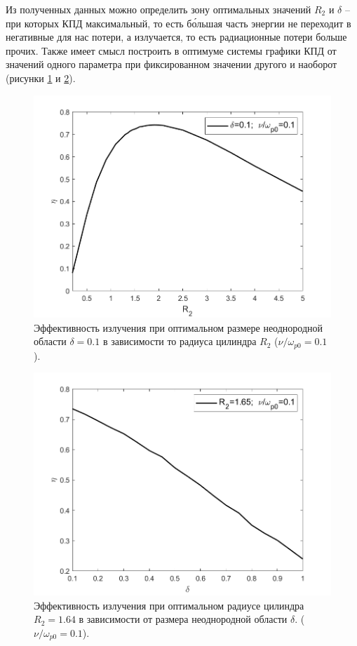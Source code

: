 \newpage
Из полученных данных можно определить зону оптимальных значений $R_{2}$ и $\delta$ -- при которых КПД максимальный, то есть б\'ольшая часть энергии не переходит в негативные для нас потери, а излучается, то есть радиационные потери больше прочих. Также имеет смысл построить в оптимуме системы графики КПД от значений одного параметра при фиксированном значении другого и наоборот (рисунки \ref{ris:kpd_r2_delta_07} и \ref{ris:kpd_r2_delta_07_1}).

\begin{figure}[H]
	\centering
	\includegraphics[scale=0.7]{pics/KPD_r2}
	\caption{Эффективность излучения при оптимальном размере неоднородной области $\delta=0.1$ в зависимости то радиуса цилиндра $R_{2}$ ($\nu / \omega_{p 0}=0.1$).}
	\label{ris:kpd_r2_delta_07}
\end{figure}

\begin{figure}[H]
	\centering
	\includegraphics[scale=0.7]{pics/KPD_delta}
	\caption{Эффективность излучения при оптимальном радиусе цилиндра $R_{2}=1.64$ в зависимости от размера неоднородной области $\delta$. ($\nu / \omega_{p 0}=0.1$).}
	\label{ris:kpd_r2_delta_07_1}
\end{figure}


